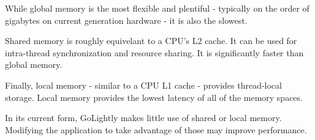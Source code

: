 While global memory is the most flexible and plentiful - typically on the order of gigabytes on current generation hardware - it is also the slowest. 

Shared memory is roughly equivelant to a CPU's L2 cache. It can be used for intra-thread synchronization and resource sharing. It is significantly faster than global memory.

Finally, local memory - similar to a CPU L1 cache - provides thread-local storage. Local memory provides the lowest latency of all of the memory spaces.

In its current form, GoLightly makes little use of shared or local memory. Modifying the application to take advantage of those may improve performance.







